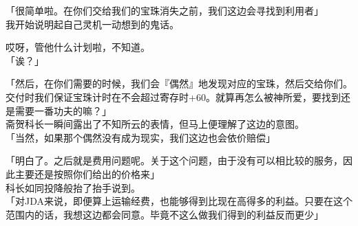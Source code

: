 「很简单啦。在你们交给我们的宝珠消失之前，我们这边会寻找到利用者」\\

我开始说明起自己灵机一动想到的鬼话。

哎呀，管他什么计划啦，不知道。\\

「诶？」

「然后，在你们需要的时候，我们会『偶然』地发现对应的宝珠，然后交给你们。交付时我们保证宝珠计时在不会超过寄存时+60。就算再怎么被神所爱，要找到还是需要一番功夫的嘛？」\\

斋贺科长一瞬间露出了不知所云的表情，但马上便理解了这边的意图。\\

「当然，如果那个偶然没有成为现实，我们这边也会依价赔偿」

「明白了。之后就是费用问题呢。关于这个问题，由于没有可以相比较的服务，因此主要还是按照你们给出的价格来」\\

科长如同投降般抬了抬手说到。\\

「对JDA来说，即便算上运输经费，也能够得到比现在高得多的利益。只要在这个范围内的话，我想这边都会同意。毕竟不这么做我们得到的利益反而更少」\\

